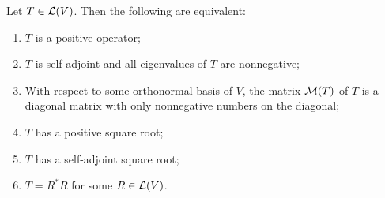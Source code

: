 \begin{thm}
  \label{thm: characterizations of positive operators}
  Let $T \in \mathcal{L}(V)$. Then the following are equivalent:
  \begin{enumerate}[label=\textbf{(\alph*)}]
    \item $T$ is a positive operator;
    \item $T$ is self-adjoint and all eigenvalues of $T$ are nonnegative;
    \item With respect to some orthonormal basis of $V$, the matrix $\mathcal{M}(T)$ of $T$ is a diagonal matrix with only nonnegative numbers on the diagonal;
    \item $T$ has a positive square root;
    \item $T$ has a self-adjoint square root;
    \item $T = R^* R$ for some $R \in \mathcal{L}(V)$.
  \end{enumerate}
\end{thm}
